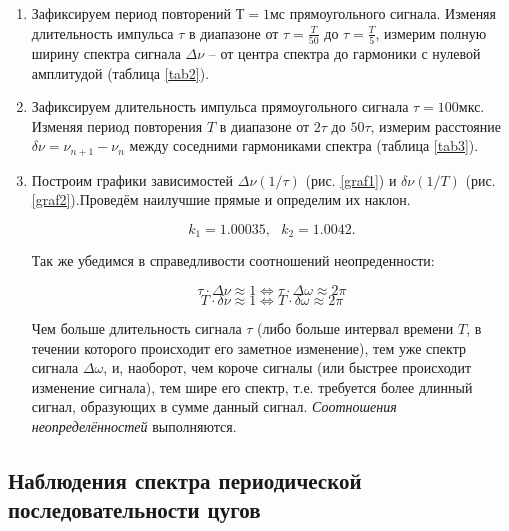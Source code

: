 \documentclass[a4paper,12pt]{article} %
\begin{document}
\begin{enumerate}
     \item Зафиксируем период повторений $Т = 1 \text{мс}$ прямоугольного сигнала. Изменяя длительность импульса $\tau$ в диапазоне от $\tau = \frac{T}{50}$ до $\tau = \frac{T}{5}$, измерим полную ширину спектра сигнала $\Delta \nu$ -- от центра спектра до гармоники с нулевой амплитудой (таблица \ref{tab2}).

    \item Зафиксируем длительность импульса прямоугольного сигнала $\tau = 100 \text{мкс}$. Изменяя период повторения $T$ в диапазоне от $2\tau$ до $50\tau$, измерим расстояние $\delta \nu = \nu_{n+1} - \nu_{n}$ между соседними гармониками спектра (таблица \ref{tab3}).

    \item Построим графики зависимостей $\Delta \nu(1/\tau)$ (рис. \ref{graf1}) и $\delta \nu(1/T)$ (рис. \ref{graf2}).Проведём наилучшие прямые и определим их наклон. 

    \[ k_1 = 1.00035, \text{ } k_2 = 1.0042. \]
    
    Так же убедимся в справедливости соотношений неопреденности:

    \[ \tau \cdot \Delta \nu \approx 1 \Longleftrightarrow \tau \cdot \Delta \omega \approx 2\pi\]
    \[ T \cdot \delta \nu \approx 1 \Longleftrightarrow T \cdot \delta \omega \approx 2\pi\]

    Чем больше длительность сигнала $\tau$ (либо больше интервал времени $T$, в течении которого происходит его заметное изменение), тем уже спектр сигнала $\Delta \omega$, и, наоборот, чем короче сигналы (или быстрее происходит изменение сигнала), тем шире его спектр, т.е. требуется более длинный сигнал, образующих в сумме данный сигнал. \textit{Соотношения неопределённостей} выполняются.
\end{enumerate}

\subsection{Наблюдения спектра периодической последовательности цугов}
\end{document}
